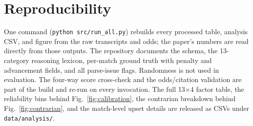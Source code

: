\documentclass[sigconf,review]{acmart}
\begin{document}



\appendix
\section{Reproducibility}
One command (\texttt{python src/run\_all.py}) rebuilds every processed table,
analysis CSV, and figure from the raw transcripts and odds; the paper's numbers
are read directly from those outputs. The repository documents the schema,
the 13-category reasoning lexicon, per-match ground truth with penalty and
advancement fields, and all parse-issue flags. Randomness is not used in
evaluation. The four-way score cross-check and the odds/citation validation are
part of the build and re-run on every invocation. The full 13$\times$4 factor
table, the reliability bins behind Fig.~\ref{fig:calibration}, the contrarian
breakdown behind Fig.~\ref{fig:contrarian}, and the match-level upset details are
released as CSVs under \texttt{data/analysis/}.
\end{document}
